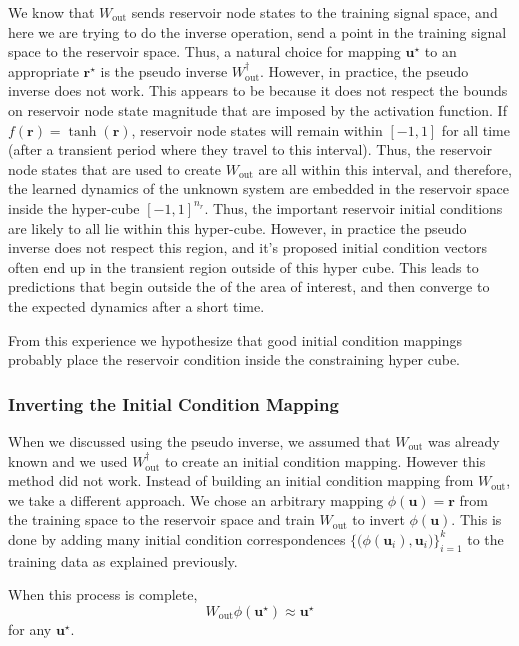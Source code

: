 \documentclass{article}
\begin{document}
We know that $W_\text{out}$ sends reservoir node states to the training signal space, and here we are trying to do the inverse operation, send a point in the training signal space to the reservoir space. Thus, a natural choice for mapping $\mathbf{u}^\star$ to an appropriate $\mathbf{r}^\star$ is the pseudo inverse $W_\text{out}^\dagger$. However, in practice, the pseudo inverse does not work. This appears to be because it does not respect the bounds on reservoir node state magnitude that are imposed by the activation function. If $f(\mathbf{r}) = \tanh(\mathbf{r})$, reservoir node states will remain within $[-1,1]$ for all time (after a transient period where they travel to this interval). Thus, the reservoir node states that are used to create $W_\text{out}$ are all within this interval, and therefore, the learned dynamics of the unknown system are embedded in the reservoir space inside the hyper-cube $[-1,1]^{n_r}$. Thus, the important reservoir initial conditions are likely to all lie within this hyper-cube. However, in practice the pseudo inverse does not respect this region, and it's proposed initial condition vectors often end up in the transient region outside of this hyper cube. This leads to predictions that begin outside the of the area of interest, and then converge to the expected dynamics after a short time.

From this experience we hypothesize that good initial condition mappings probably place the reservoir condition inside the constraining hyper cube.

\subsubsection*{Inverting the Initial Condition Mapping}
When we discussed using the pseudo inverse, we assumed that $W_\text{out}$ was already known and we used $W_\text{out}^\dagger$ to create an initial condition mapping. However this method did not work. Instead of building an initial condition mapping from $W_\text{out}$, we take a different approach. We chose an arbitrary mapping $\phi (\mathbf{u}) = \mathbf{r}$ from the training space to the reservoir space and train  $W_\text{out}$ to invert $\phi(\mathbf{u})$.  This is done by adding many initial condition correspondences $\{ \big( \phi (\mathbf{u}_i), \mathbf{u}_i \big)\}_{i=1}^{k}$ to the training data as explained previously. 

When this process is complete, 
\[W_\text{out} \phi(\mathbf{u}^\star) \approx \mathbf{u}^\star
\]
for any $\mathbf{u}^\star$.
\end{document}
